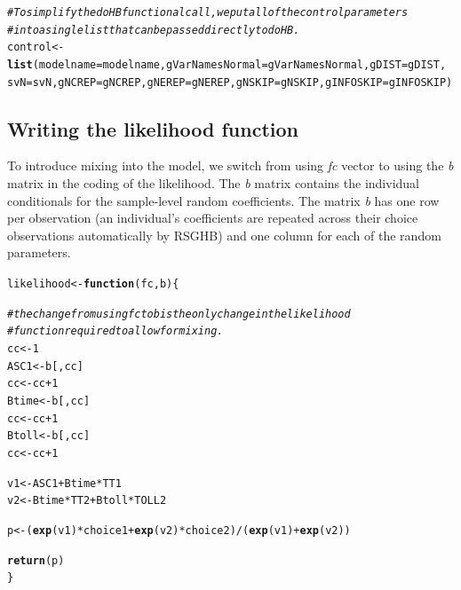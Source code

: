 \documentclass{article}\usepackage[]{graphicx}\usepackage[]{color}
\makeatletter
\newcommand{\hlnum}[1]{\textcolor[rgb]{0.686,0.059,0.569}{#1}}%
\newcommand{\hlcom}[1]{\textcolor[rgb]{0.678,0.584,0.686}{\textit{#1}}}%
\newcommand{\hlopt}[1]{\textcolor[rgb]{0,0,0}{#1}}%
\newcommand{\hlstd}[1]{\textcolor[rgb]{0.345,0.345,0.345}{#1}}%
\newcommand{\hlkwa}[1]{\textcolor[rgb]{0.161,0.373,0.58}{\textbf{#1}}}%
\newcommand{\hlkwb}[1]{\textcolor[rgb]{0.69,0.353,0.396}{#1}}%
\newcommand{\hlkwc}[1]{\textcolor[rgb]{0.333,0.667,0.333}{#1}}%
\newcommand{\hlkwd}[1]{\textcolor[rgb]{0.737,0.353,0.396}{\textbf{#1}}}%
\newenvironment{kframe}{%
 \def\at@end@of@kframe{}%
 \ifinner\ifhmode%
  \def\at@end@of@kframe{\end{minipage}}%
  \begin{minipage}{\columnwidth}%
 \fi\fi%
 \def\FrameCommand##1{\hskip\@totalleftmargin \hskip-\fboxsep
 \colorbox{shadecolor}{##1}\hskip-\fboxsep
     \hskip-\linewidth \hskip-\@totalleftmargin \hskip\columnwidth}%
 \MakeFramed {\advance\hsize-\width
   \@totalleftmargin\z@ \linewidth\hsize
   \@setminipage}}%
 {\par\unskip\endMakeFramed%
 \at@end@of@kframe}
\newenvironment{knitrout}{}{} %
\makeatother
\begin{document}
\begin{knitrout}
\begin{kframe}
\begin{alltt}
\hlcom{# To simplify the doHB functional call, we put all of the control parameters}
\hlcom{# into a single list that can be passed directly to doHB.}
\hlstd{control} \hlkwb{<-} \hlkwd{list}\hlstd{(}\hlkwc{modelname} \hlstd{= modelname,} \hlkwc{gVarNamesNormal} \hlstd{= gVarNamesNormal,} \hlkwc{gDIST} \hlstd{= gDIST,}
    \hlkwc{svN} \hlstd{= svN,} \hlkwc{gNCREP} \hlstd{= gNCREP,} \hlkwc{gNEREP} \hlstd{= gNEREP,} \hlkwc{gNSKIP} \hlstd{= gNSKIP,} \hlkwc{gINFOSKIP} \hlstd{= gINFOSKIP)}
\end{alltt}
\end{kframe}
\end{knitrout}


\subsection*{Writing the likelihood function}

To introduce mixing into the model, we switch from using \emph{fc} vector to using the \emph{b} matrix in the coding of the likelihood. The \emph{b} matrix contains the individual conditionals for the sample-level random coefficients. The matrix \emph{b} has one row per observation (an individual's coefficients are repeated across their choice observations automatically by RSGHB) and one column for each of the random parameters.

\begin{knitrout}
\color{fgcolor}\begin{kframe}
\begin{alltt}
\hlstd{likelihood} \hlkwb{<-} \hlkwa{function}\hlstd{(}\hlkwc{fc}\hlstd{,} \hlkwc{b}\hlstd{) \{}

    \hlcom{# the change from using fc to b is the only change in the likelihood}
    \hlcom{# function required to allow for mixing.}
    \hlstd{cc} \hlkwb{<-} \hlnum{1}
    \hlstd{ASC1} \hlkwb{<-} \hlstd{b[, cc]}
    \hlstd{cc} \hlkwb{<-} \hlstd{cc} \hlopt{+} \hlnum{1}
    \hlstd{Btime} \hlkwb{<-} \hlstd{b[, cc]}
    \hlstd{cc} \hlkwb{<-} \hlstd{cc} \hlopt{+} \hlnum{1}
    \hlstd{Btoll} \hlkwb{<-} \hlstd{b[, cc]}
    \hlstd{cc} \hlkwb{<-} \hlstd{cc} \hlopt{+} \hlnum{1}

    \hlstd{v1} \hlkwb{<-} \hlstd{ASC1} \hlopt{+} \hlstd{Btime} \hlopt{*} \hlstd{TT1}
    \hlstd{v2} \hlkwb{<-} \hlstd{Btime} \hlopt{*} \hlstd{TT2} \hlopt{+} \hlstd{Btoll} \hlopt{*} \hlstd{TOLL2}

    \hlstd{p} \hlkwb{<-} \hlstd{(}\hlkwd{exp}\hlstd{(v1)} \hlopt{*} \hlstd{choice1} \hlopt{+} \hlkwd{exp}\hlstd{(v2)} \hlopt{*} \hlstd{choice2)}\hlopt{/}\hlstd{(}\hlkwd{exp}\hlstd{(v1)} \hlopt{+} \hlkwd{exp}\hlstd{(v2))}

    \hlkwd{return}\hlstd{(p)}
\hlstd{\}}
\end{alltt}
\end{kframe}
\end{knitrout}
\end{document}
